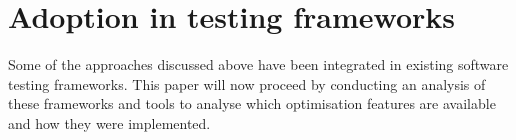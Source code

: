 
\section{Adoption in testing frameworks}
Some of the approaches discussed above have been integrated in existing software testing frameworks. This paper will now proceed by conducting an analysis of these frameworks and tools to analyse which optimisation features are available and how they were implemented.



